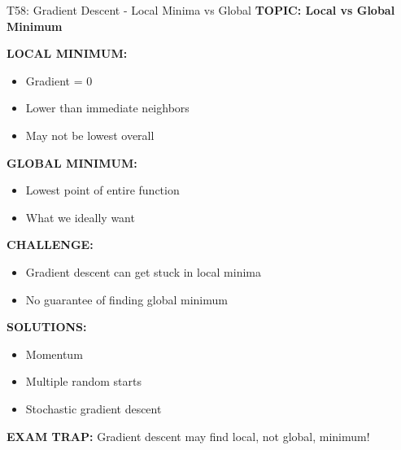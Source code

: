 \documentclass[8pt]{beamer}
\begin{document}
	\begin{frame}{T58: Gradient Descent - Local Minima vs Global}
		\fontsize{6.5}{7.5}\selectfont
		\textbf{TOPIC: Local vs Global Minimum}
		
		\vspace{0.1cm}
		\textbf{LOCAL MINIMUM:}
		\begin{itemize}
			\item Gradient = 0
			\item Lower than immediate neighbors
			\item May not be lowest overall
		\end{itemize}
		
		\vspace{0.1cm}
		\textbf{GLOBAL MINIMUM:}
		\begin{itemize}
			\item Lowest point of entire function
			\item What we ideally want
		\end{itemize}
		
		\vspace{0.1cm}
		\textbf{CHALLENGE:}
		\begin{itemize}
			\item Gradient descent can get stuck in local minima
			\item No guarantee of finding global minimum
		\end{itemize}
		
		\vspace{0.1cm}
		\textbf{SOLUTIONS:}
		\begin{itemize}
			\item Momentum
			\item Multiple random starts
			\item Stochastic gradient descent
		\end{itemize}
		
		\textcolor{myred}{\textbf{EXAM TRAP:}} Gradient descent may find \textcolor{myblue}{local, not global}, minimum!
	\end{frame}
	
\end{document}
